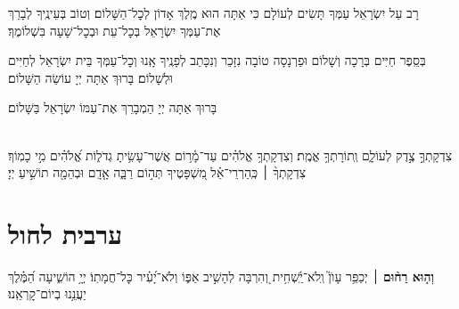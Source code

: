 \documentclass[twoside, openany, parskip=half, 11pt]{book}
\begin{document}
 

\sepline

\label{ytmincha}
\ytkiddushhayom{}

\sepline

\retzeh

\yaalehveyavo

\zion

\modim

\shabboschanukah

\shabboshodos

רָב עַל יִשְׂרָאֵל עַמְּךָ תָּשִׂים לְעוֹלָם כִּי אַתָּה הוּא מֶֽלֶךְ אָדוֹן לְכׇל־הַשָּׁלוֹם׃ וְטוֹב בְּעֵינֶֽיךָ לְבָרֵךְ אֶת־עַמְּךָ יִשְׂרָאֵל בְּכׇל־עֵת וּבְכׇל־שָׁעָה בִּשְׁלוֹמֶךָ׃
\vspace{-0.4\baselineskip}
\begin{paracol}{2}

\begin{small}
בְּסֵֽפֶר חַיִּים בְּרָכָה וְשָׁלוֹם וּפַרְנָסָה טוֹבָה נִזָּכֵר וְנִכָּתֵב לְפָנֶֽיךָ אָֽנוּ וְכׇל־עַמְּךָ בֵּית יִשְׂרָאֵל לְחַיִּים וּלְשָׁלוֹם׃ בָּרוּךְ אַתָּה יְיָ עוֹשֵׂה הַשָּׁלוֹם׃

\end{small}
\switchcolumn
בָּרוּךְ אַתָּה יְיָ הַמְבָרֵךְ אֶת־עַמּוֹ יִשְׂרָאֵל בַּשָּׁלוֹם׃

\end{paracol}

\tachanunim

\\
צִדְקָתְךָ֣ צֶ֣דֶק לְעוֹלָ֑ם וְֽתוֹרָתְךָ֥ אֱמֶֽת׃ וְצִדְקָתְךָ֥ אֱלֹהִ֗ים עַד־מָ֫ר֥וֹם אֲשֶׁר־עָשִׂ֥יתָ גְדֹל֑וֹת אֱ֝לֹהִ֗ים מִ֣י כָמֽוֹךָ׃ צִדְקָתְךָ֨ ׀ כְּֽהַרְרֵי־אֵ֗ל מִ֭שְׁפָּטֶיךָ תְּה֣וֹם רַבָּ֑ה אָ֤דָֽם וּבְהֵמָ֖ה תוֹשִׁ֣יעַ יְיָ׃

\fullkaddish

\aleinu





%
\chapter[ערבית לחול]{ ערבית לחול }

\textbf{וְה֤וּא רַח֨וּם}
׀ יְכַפֵּ֥ר עָוֺן֮ וְֽלֹא־יַֽ֫שְׁחִ֥ית וְ֭הִרְבָּה לְהָשִׁ֣יב אַפּ֑וֹ וְלֹא־יָ֝עִ֗יר כׇּל־חֲמָתֽוֹ׃
יְיָ֥ הוֹשִׁ֑יעָה הַ֝מֶּ֗לֶךְ יַעֲנֵ֥נוּ בְיוֹם־קׇרְאֵֽנוּ׃
\end{document}
